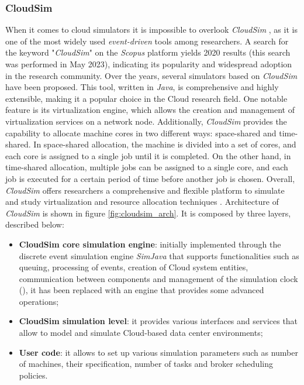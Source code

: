 {\subsubsection{CloudSim}
When it comes to cloud simulators it is impossible to overlook \emph{CloudSim} \cite{calheiros2011cloudsim}, as it is one of the most widely used \emph{event-driven} tools among researchers. A search for the keyword "\emph{CloudSim}" on the \emph{Scopus} platform yields 2020 results (this search was performed in May 2023), indicating its popularity and widespread adoption in the research community. Over the years, several simulators based on \emph{CloudSim} have been proposed. This tool, written in \emph{Java}, is comprehensive and highly extensible, making it a popular choice in the Cloud research field.
One notable feature is its virtualization engine, which allows the creation and management of virtualization services on a network node. Additionally, \emph{CloudSim} provides the capability to allocate machine cores in two different ways: space-shared and time-shared.
In space-shared allocation, the machine is divided into a set of cores, and each core is assigned to a single job until it is completed. On the other hand, in time-shared allocation, multiple jobs can be assigned to a single core, and each job is executed for a certain period of time before another job is chosen.
Overall, \emph{CloudSim} offers researchers a comprehensive and flexible platform to simulate and study virtualization and resource allocation techniques \cite{mansouri2020cloud}.
Architecture of \emph{CloudSim} is shown in figure \ref{fig:cloudsim_arch}. It is composed by three layers, described below:
\begin{itemize}
    \item \textbf{CloudSim core simulation engine}: initially implemented through the discrete event simulation engine \emph{SimJava} that supports functionalities such as queuing, processing of events, creation of Cloud system entities, communication between components and management of the simulation clock (\cite{calheiros2011cloudsim}), it has been replaced with an engine that provides some advanced operations;
    \item \textbf{CloudSim simulation level}: it provides various interfaces and services that allow to model and simulate Cloud-based data center environments; 
    \item \textbf{User code}: it allows to set up various simulation parameters such as number of machines, their specification, number of tasks and broker scheduling policies.

\end{itemize}}
